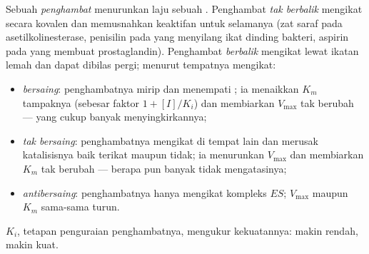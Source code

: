\begin{definition}[Penghambat]\label{def:b1:enzymes:inhibitors}
Sebuah \emph{penghambat} menurunkan laju sebuah
. Penghambat \emph{tak berbalik} mengikat secara kovalen dan
memusnahkan keaktifan  untuk selamanya (zat saraf pada
asetilkolinesterase, penisilin pada  yang menyilang ikat dinding
bakteri, aspirin pada  yang membuat prostaglandin). Penghambat
\emph{berbalik} mengikat lewat ikatan lemah dan dapat dibilas pergi;
menurut tempatnya mengikat:
\begin{itemize}
  \item \emph{bersaing}: penghambatnya
        mirip  dan menempati ; ia menaikkan
        $K_m$ tampaknya (sebesar faktor $1 + [I]/K_i$) dan membiarkan
        $V_{\max}$ tak berubah ---  yang cukup banyak
        menyingkirkannya;
  \item \emph{tak bersaing}: penghambatnya mengikat di tempat lain dan
        merusak katalisisnya baik  terikat maupun tidak; ia
        menurunkan $V_{\max}$ dan membiarkan $K_m$ tak berubah ---
        berapa pun banyak  tidak mengatasinya;
  \item \emph{antibersaing}: penghambatnya hanya mengikat kompleks
        $ES$; $V_{\max}$ maupun $K_m$ sama-sama turun.
\end{itemize}
$K_i$, tetapan penguraian penghambatnya, mengukur kekuatannya: makin
rendah, makin kuat.
\end{definition}

